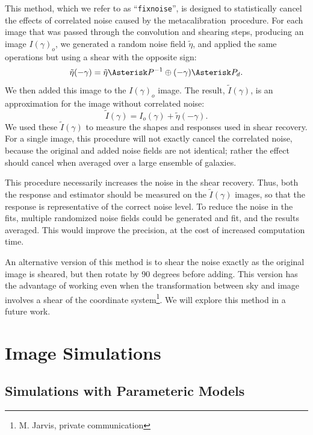 \documentclass[usegraphicx,usenatbib]{mn2e}
\newcommand{\mcal}{metacalibration}
\newcommand{\fixnoise}{\texttt{fixnoise}}
\begin{document}
This method, which we refer to as ``\fixnoise'', is designed to statistically
cancel the effects of correlated noise caused by the \mcal\ procedure.  For each
image that was passed through the convolution and shearing steps, producing
an image $I(\gamma)_o$, we generated a random noise field
$\tilde{\eta}$, and applied the same operations but using a shear with
the opposite sign:
\begin{equation}
    \tilde{\eta}(-\gamma) = \tilde{\eta} \Asterisk P^{-1} \oplus (-\gamma) \Asterisk P_{d}.
\end{equation}
We then added this image to the $I(\gamma)_o$ image.
The result, $\tilde{I}(\gamma)$, is an approximation for the image
without correlated noise:
\begin{equation}
    \tilde{I}(\gamma) = I_o(\gamma) + \tilde{\eta}(-\gamma).
\end{equation}
We used these $\tilde{I}(\gamma)$ to measure the shapes and responses used in
shear recovery.  For a single image, this procedure will not exactly cancel the
correlated noise, because the original and added noise fields are not
identical; rather the effect should cancel when averaged over a large ensemble
of galaxies.

This procedure necessarily increases the noise in the shear recovery.  Thus,
both the response and estimator should be measured on the $\tilde{I}(\gamma)$
images, so that the response is representative of the correct noise level.  To
reduce the noise in the fits, multiple randomized noise fields could be
generated and fit, and the results averaged.  This would improve the precision,
at the cost of increased computation time.

An alternative version of this method is to shear the noise exactly as the
original image is sheared, but then rotate by 90 degrees before adding.  This
version has the advantage of working even when the transformation between sky
and image involves a shear of the coordinate system\footnote{M. Jarvis, private
communication}. We will explore this method in a future work.

\section{Image Simulations} \label{sec:sims}

\subsection{Simulations with Parameteric Models} \label{sec:bdsim}
\end{document}
